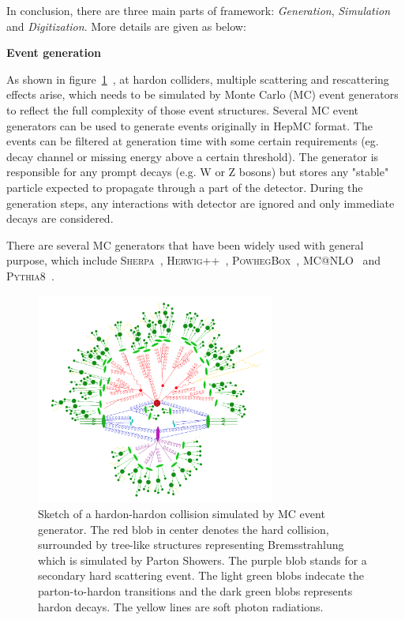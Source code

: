 In conclusion, there are three main parts of framework: \textit{Generation}, \textit{Simulation} and \textit{Digitization}.
More details are given as below:

\textbf{Event generation}

As shown in figure~\ref{fig:mc_event_structure}~\cite{Hoche:2014rga}, at hardon colliders, multiple scattering and rescattering effects arise, which needs to be simulated by Monte Carlo (MC) event generators to reflect the full complexity of those event structures.
Several MC event generators can be used to generate events originally in HepMC format.
The events can be filtered at generation time with some certain requirements (eg. decay channel or missing energy above a certain threshold).
The generator is responsible for any prompt decays (e.g. W or Z bosons) but stores any "stable" particle expected to propagate through a part of the detector. 
During the generation steps, any interactions with detector are ignored and only immediate decays are considered.

There are several MC generators that have been widely used with general purpose, which include \textsc{Sherpa}~\cite{Gleisberg_2009}, \textsc{Herwig++}~\cite{Bahr2008}, \textsc{PowhegBox}~\cite{Nason:2004rx}, \textsc{MC@NLO}~\cite{Frixione_2002} and \textsc{Pythia8}~\cite{Sjostrand:2007gs}.

\begin{figure}[!htb]
  \centering
  \includegraphics[width=0.7\textwidth]{figures/Simulation/mc_event_structure.png}
  \caption{Sketch of a hardon-hardon collision simulated by MC event generator. The red blob in center denotes the hard collision, surrounded by tree-like structures representing Bremsstrahlung which is simulated by Parton Showers. The purple blob stands for a secondary hard scattering event. The light green blobs indecate the parton-to-hardon transitions and the dark green blobs represents hardon decays. The yellow lines are soft photon radiations.}
  \label{fig:mc_event_structure}
\end{figure}

